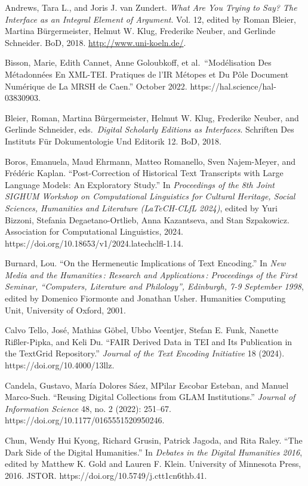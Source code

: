 \documentclass[
  letterpaper,
  DIV=11,
  numbers=noendperiod]{scrreprt}
\begin{document}
Andrews, Tara L., and Joris J. van Zundert. \emph{What Are You Trying to
Say? The Interface as an Integral Element of Argument}. Vol. 12, edited
by Roman Bleier, Martina Bürgermeister, Helmut W. Klug, Frederike
Neuber, and Gerlinde Schneider. BoD, 2018.
\url{http://www.uni-koeln.de/}.

Bisson, Marie, Edith Cannet, Anne Goloubkoff, et al.~``Modélisation Des
Métadonnées En XML-TEI. Pratiques de l'IR Métopes et Du Pôle Document
Numérique de La MRSH de Caen.'' October 2022.
https://hal.science/hal-03830903.

Bleier, Roman, Martina Bürgermeister, Helmut W. Klug, Frederike Neuber,
and Gerlinde Schneider, eds.~\emph{Digital Scholarly Editions as
Interfaces}. Schriften Des Instituts Für Dokumentologie Und Editorik 12.
BoD, 2018.

Boros, Emanuela, Maud Ehrmann, Matteo Romanello, Sven Najem-Meyer, and
Frédéric Kaplan. ``Post-Correction of Historical Text Transcripts with
Large Language Models: An Exploratory Study.'' In \emph{Proceedings of
the 8th Joint SIGHUM Workshop on Computational Linguistics for Cultural
Heritage, Social Sciences, Humanities and Literature (LaTeCH-CLfL
2024)}, edited by Yuri Bizzoni, Stefania Degaetano-Ortlieb, Anna
Kazantseva, and Stan Szpakowicz. Association for Computational
Linguistics, 2024. https://doi.org/10.18653/v1/2024.latechclfl-1.14.

Burnard, Lou. ``On the Hermeneutic Implications of Text Encoding.'' In
\emph{New Media and the Humanities\,: Research and Applications\,:
Proceedings of the First Seminar, ``Computers, Literature and
Philology'', Edinburgh, 7-9 September 1998}, edited by Domenico
Fiormonte and Jonathan Usher. Humanities Computing Unit, University of
Oxford, 2001.

Calvo Tello, José, Mathias Göbel, Ubbo Veentjer, Stefan E. Funk, Nanette
Rißler-Pipka, and Keli Du. ``FAIR Derived Data in TEI and Its
Publication in the TextGrid Repository.'' \emph{Journal of the Text
Encoding Initiative} 18 (2024). https://doi.org/10.4000/13llz.

Candela, Gustavo, María Dolores Sáez, MPilar Escobar Esteban, and Manuel
Marco-Such. ``Reusing Digital Collections from GLAM Institutions.''
\emph{Journal of Information Science} 48, no. 2 (2022): 251--67.
https://doi.org/10.1177/0165551520950246.

Chun, Wendy Hui Kyong, Richard Grusin, Patrick Jagoda, and Rita Raley.
``The Dark Side of the Digital Humanities.'' In \emph{Debates in the
Digital Humanities 2016}, edited by Matthew K. Gold and Lauren F. Klein.
University of Minnesota Press, 2016. JSTOR.
https://doi.org/10.5749/j.ctt1cn6thb.41.
\end{document}
